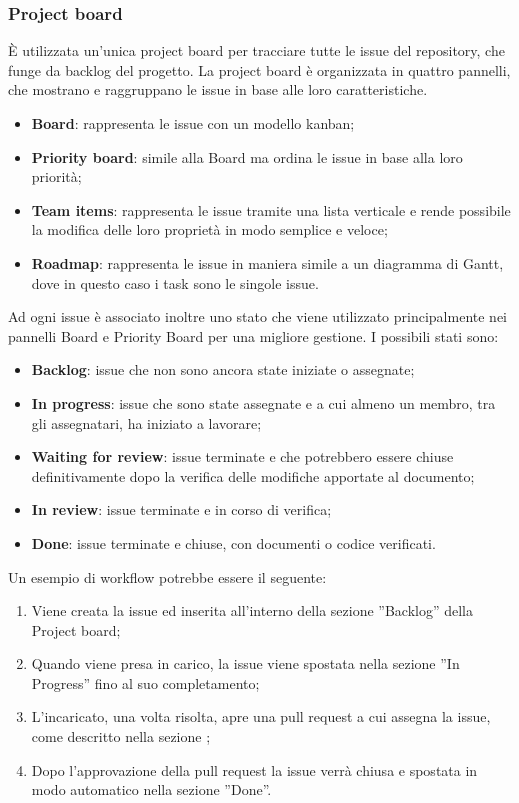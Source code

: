 \subsubsection{Project board}\label{inf:pb}
È utilizzata un'unica project board per tracciare tutte le issue del repository, che funge da backlog del progetto. 
La project board è organizzata in quattro pannelli, che mostrano e raggruppano le issue in base alle loro caratteristiche.
\begin{itemize}
    \item \textbf{Board}: rappresenta le issue con un modello kanban;
    \item \textbf{Priority board}: simile alla Board ma ordina le issue in base alla loro priorità;
    \item \textbf{Team items}: rappresenta le issue tramite una lista verticale e rende possibile
          la modifica delle loro proprietà in modo semplice e veloce;
    \item \textbf{Roadmap}: rappresenta le issue in maniera simile a un diagramma di Gantt,
          dove in questo caso i task sono le singole issue.
\end{itemize}
Ad ogni issue è associato inoltre uno stato che viene utilizzato principalmente nei pannelli Board e Priority Board per una migliore gestione.
I possibili stati sono:
\begin{itemize}
    \item \textbf{Backlog}: issue che non sono ancora state iniziate o assegnate;
    \item \textbf{In progress}: issue che sono state assegnate e a cui almeno un membro, tra gli assegnatari, ha iniziato a lavorare;
    \item \textbf{Waiting for review}: issue terminate e che potrebbero essere chiuse definitivamente dopo la verifica delle modifiche apportate al documento;
    \item \textbf{In review}: issue terminate e in corso di verifica;
    \item \textbf{Done}: issue terminate e chiuse, con documenti o codice verificati.
\end{itemize}
Un esempio di workflow potrebbe essere il seguente:
\begin{enumerate}
    \item Viene creata la issue ed inserita all'interno della sezione ”Backlog” della
          Project board;
    \item Quando viene presa in carico, la issue viene spostata nella sezione ”In
          Progress” fino al suo completamento;
    \item L'incaricato, una volta risolta, apre una pull request a cui assegna la issue,
          come descritto nella sezione ;
    \item Dopo l'approvazione della pull request la issue verrà chiusa e spostata in modo
          automatico nella sezione ”Done”.
\end{enumerate}

